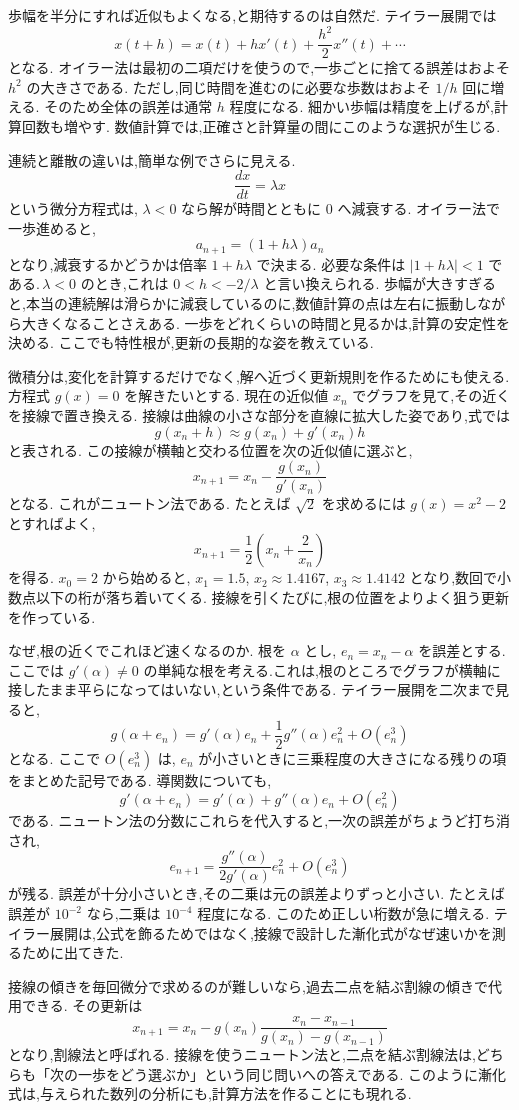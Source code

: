 歩幅を半分にすれば近似もよくなる,と期待するのは自然だ.
テイラー展開では
\[
  x(t+h)=x(t)+hx'(t)+\frac{h^2}{2}x''(t)+\cdots
\]
となる.
オイラー法は最初の二項だけを使うので,一歩ごとに捨てる誤差はおよそ $h^2$ の大きさである.
ただし,同じ時間を進むのに必要な歩数はおよそ $1/h$ 回に増える.
そのため全体の誤差は通常 $h$ 程度になる.
細かい歩幅は精度を上げるが,計算回数も増やす.
数値計算では,正確さと計算量の間にこのような選択が生じる.

連続と離散の違いは,簡単な例でさらに見える.
\[
  \frac{dx}{dt}=\lambda x
\]
という微分方程式は,\,\,$\lambda<0$ なら解が時間とともに $0$ へ減衰する.
オイラー法で一歩進めると,
\[
  a_{n+1}=(1+h\lambda)a_n
\]
となり,減衰するかどうかは倍率 $1+h\lambda$ で決まる.
必要な条件は $|1+h\lambda|<1$ である.\,$\lambda<0$ のとき,これは $0<h<-2/\lambda$ と言い換えられる.
歩幅が大きすぎると,本当の連続解は滑らかに減衰しているのに,数値計算の点は左右に振動しながら大きくなることさえある.
一歩をどれくらいの時間と見るかは,計算の安定性を決める.
ここでも特性根が,更新の長期的な姿を教えている.

微積分は,変化を計算するだけでなく,解へ近づく更新規則を作るためにも使える.
方程式 $g(x)=0$ を解きたいとする.
現在の近似値 $x_n$ でグラフを見て,その近くを接線で置き換える.
接線は曲線の小さな部分を直線に拡大した姿であり,式では
\[
  g(x_n+h)\approx g(x_n)+g'(x_n)h
\]
と表される.
この接線が横軸と交わる位置を次の近似値に選ぶと,
\[
  x_{n+1}=x_n-\frac{g(x_n)}{g'(x_n)}
\]
となる.
これがニュートン法である.
たとえば $\sqrt2$ を求めるには $g(x)=x^2-2$ とすればよく,
\[
  x_{n+1}=\frac12\left(x_n+\frac2{x_n}\right)
\]
を得る.
$x_0=2$ から始めると,\,\,$x_1=1.5$,\,\,$x_2\approx1.4167$,\,\,$x_3\approx1.4142$ となり,数回で小数点以下の桁が落ち着いてくる.
接線を引くたびに,根の位置をよりよく狙う更新を作っている.

なぜ,根の近くでこれほど速くなるのか.
根を $\alpha$ とし,\,\,$e_n=x_n-\alpha$ を誤差とする.
ここでは $g'(\alpha)\ne0$ の単純な根を考える.これは,根のところでグラフが横軸に接したまま平らになってはいない,という条件である.
テイラー展開を二次まで見ると,
\[
  g(\alpha+e_n)
  =g'(\alpha)e_n+\frac12g''(\alpha)e_n^2+O(e_n^3)
\]
となる.
ここで $O(e_n^3)$ は,\,\,$e_n$ が小さいときに三乗程度の大きさになる残りの項をまとめた記号である.
導関数についても,
\[
  g'(\alpha+e_n)=g'(\alpha)+g''(\alpha)e_n+O(e_n^2)
\]
である.
ニュートン法の分数にこれらを代入すると,一次の誤差がちょうど打ち消され,
\[
  e_{n+1}
  =
  \frac{g''(\alpha)}{2g'(\alpha)}e_n^2
  +O(e_n^3)
\]
が残る.
誤差が十分小さいとき,その二乗は元の誤差よりずっと小さい.
たとえば誤差が $10^{-2}$ なら,二乗は $10^{-4}$ 程度になる.
このため正しい桁数が急に増える.
テイラー展開は,公式を飾るためではなく,接線で設計した漸化式がなぜ速いかを測るために出てきた.

接線の傾きを毎回微分で求めるのが難しいなら,過去二点を結ぶ割線の傾きで代用できる.
その更新は
\[
  x_{n+1}
  =
  x_n-g(x_n)\frac{x_n-x_{n-1}}{g(x_n)-g(x_{n-1})}
\]
となり,割線法と呼ばれる.
接線を使うニュートン法と,二点を結ぶ割線法は,どちらも「次の一歩をどう選ぶか」という同じ問いへの答えである.
このように漸化式は,与えられた数列の分析にも,計算方法を作ることにも現れる.
